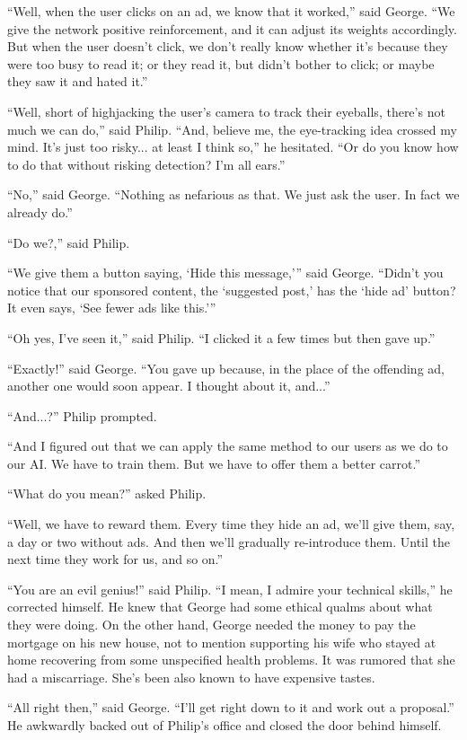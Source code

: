 \documentclass{memoir}
\begin{document}
``Well, when the user clicks on an ad, we know that it worked,'' said George. ``We give the network positive reinforcement, and it can adjust its weights accordingly. But when the user doesn't click, we don't really know whether it's because they were too busy to read it; or they read it, but didn't bother to click; or maybe they saw it and hated it.''

``Well, short of highjacking the user's camera to track their eyeballs, there's not much we can do,'' said Philip. ``And, believe me, the eye-tracking idea crossed my mind. It's just too risky... at least I think so,'' he hesitated. ``Or do you know how to do that without risking detection? I'm all ears.''

``No,'' said George. ``Nothing as nefarious as that. We just ask the user. In fact we already do.''

``Do we?,'' said Philip.

``We give them a button saying, `Hide this message,''' said George. ``Didn't you notice that our sponsored content, the `suggested post,' has the `hide ad' button? It even says, `See fewer ads like this.'''

``Oh yes, I've seen it,'' said Philip. ``I clicked it a few times but then gave up.''

``Exactly!'' said George. ``You gave up because, in the place of the offending ad, another one would soon appear. I thought about it, and...''

``And...?'' Philip prompted. 

``And I figured out that we can apply the same method to our users as we do to our AI. We have to train them. But we have to offer them a better carrot.''

``What do you mean?'' asked Philip.

``Well, we have to reward them. Every time they hide an ad, we'll give them, say, a day or two without ads. And then we'll gradually re-introduce them. Until the next time they work for us, and so on.''

``You are an evil genius!'' said Philip. ``I mean, I admire your technical skills,'' he corrected himself. He knew that George had some ethical qualms about what they were doing. On the other hand, George needed the money to pay the mortgage on his new house, not to mention supporting his wife who stayed at home recovering from some unspecified health problems. It was rumored that she had a miscarriage. She's been also known to have expensive tastes.

``All right then,'' said George. ``I'll get right down to it and work out a proposal.'' He awkwardly backed out of Philip's office and closed the door behind himself.
\end{document}
